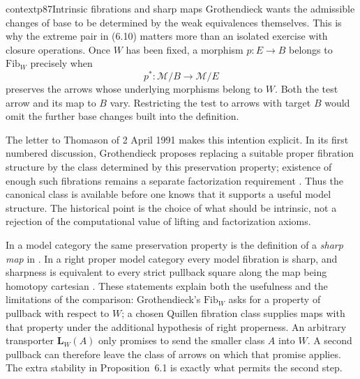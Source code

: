 \begin{dcomment}{context}{p87}{Intrinsic fibrations and sharp maps}
Grothendieck wants the admissible changes of base to be determined by the weak equivalences themselves. This is why the extreme pair in (6.10) matters more than an isolated exercise with closure operations. Once $W$ has been fixed, a morphism $p:E\to B$ belongs to $\mathrm{Fib}_W$ precisely when
\[
 p^*:\mathcal M/B\longrightarrow\mathcal M/E
\]
preserves the arrows whose underlying morphisms belong to $W$. Both the test arrow and its map to $B$ vary. Restricting the test to arrows with target $B$ would omit the further base changes built into the definition.

The letter to Thomason of 2 April 1991 makes this intention explicit. In its first numbered discussion, Grothendieck proposes replacing a suitable proper fibration structure by the class determined by this preservation property; existence of enough such fibrations remains a separate factorization requirement \citep[\S1, printed p.~4]{Grothendieck1991Letter}. Thus the canonical class is available before one knows that it supports a useful model structure. The historical point is the choice of what should be intrinsic, not a rejection of the computational value of lifting and factorization axioms.

In a model category the same preservation property is the definition of a \emph{sharp map} in \citet[\S2]{Rezk1998Sharp}. In a right proper model category every model fibration is sharp, and sharpness is equivalent to every strict pullback square along the map being homotopy cartesian \citep[Propositions~2.2 and~2.7]{Rezk1998Sharp}. These statements explain both the usefulness and the limitations of the comparison: Grothendieck's $\mathrm{Fib}_W$ asks for a property of pullback with respect to $W$; a chosen Quillen fibration class supplies maps with that property under the additional hypothesis of right properness. An arbitrary transporter $\mathbf L_W(A)$ only promises to send the smaller class $A$ into $W$. A second pullback can therefore leave the class of arrows on which that promise applies. The extra stability in Proposition~6.1 is exactly what permits the second step.
\end{dcomment}

